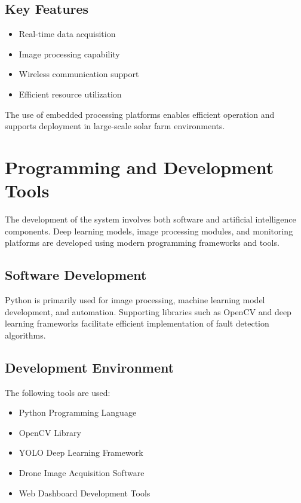 \subsection{Key Features}

\begin{itemize}
\item Real-time data acquisition
\item Image processing capability
\item Wireless communication support
\item Efficient resource utilization
\end{itemize}

The use of embedded processing platforms enables efficient operation and supports deployment in large-scale solar farm environments.

\section{Programming and Development Tools}

The development of the system involves both software and artificial intelligence components. Deep learning models, image processing modules, and monitoring platforms are developed using modern programming frameworks and tools.

\subsection{Software Development}

Python is primarily used for image processing, machine learning model development, and automation. Supporting libraries such as OpenCV and deep learning frameworks facilitate efficient implementation of fault detection algorithms.

\subsection{Development Environment}

The following tools are used:

\begin{itemize}
\item Python Programming Language
\item OpenCV Library
\item YOLO Deep Learning Framework
\item Drone Image Acquisition Software
\item Web Dashboard Development Tools
\end{itemize}


